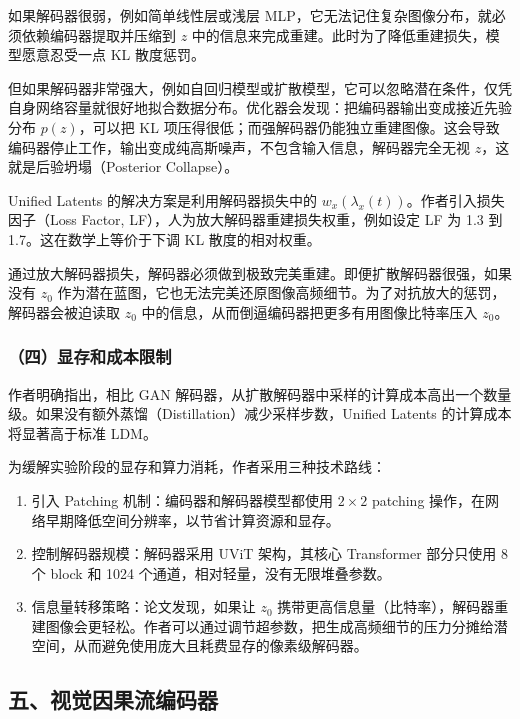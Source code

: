 如果解码器很弱，例如简单线性层或浅层 MLP，它无法记住复杂图像分布，就必须依赖编码器提取并压缩到 \(z\) 中的信息来完成重建。此时为了降低重建损失，模型愿意忍受一点 KL 散度惩罚。

但如果解码器非常强大，例如自回归模型或扩散模型，它可以忽略潜在条件，仅凭自身网络容量就很好地拟合数据分布。优化器会发现：把编码器输出变成接近先验分布 \(p(z)\)，可以把 KL 项压得很低；而强解码器仍能独立重建图像。这会导致编码器停止工作，输出变成纯高斯噪声，不包含输入信息，解码器完全无视 \(z\)，这就是后验坍塌（Posterior Collapse）。

Unified Latents 的解决方案是利用解码器损失中的 \(w_x(\lambda_x(t))\)。作者引入损失因子（Loss Factor, LF），人为放大解码器重建损失权重，例如设定 LF 为 1.3 到 1.7。这在数学上等价于下调 KL 散度的相对权重。

通过放大解码器损失，解码器必须做到极致完美重建。即便扩散解码器很强，如果没有 \(z_0\) 作为潜在蓝图，它也无法完美还原图像高频细节。为了对抗放大的惩罚，解码器会被迫读取 \(z_0\) 中的信息，从而倒逼编码器把更多有用图像比特率压入 \(z_0\)。

\hypertarget{ux56dbux663eux5b58ux548cux6210ux672cux9650ux5236}{%
\subsubsection{（四）显存和成本限制}\label{ux56dbux663eux5b58ux548cux6210ux672cux9650ux5236}}

作者明确指出，相比 GAN 解码器，从扩散解码器中采样的计算成本高出一个数量级。如果没有额外蒸馏（Distillation）减少采样步数，Unified Latents 的计算成本将显著高于标准 LDM。

为缓解实验阶段的显存和算力消耗，作者采用三种技术路线：

\begin{enumerate}
\def\labelenumi{\arabic{enumi}.}
\tightlist
\item
  引入 Patching 机制：编码器和解码器模型都使用 \(2\times2\) patching 操作，在网络早期降低空间分辨率，以节省计算资源和显存。
\item
  控制解码器规模：解码器采用 UViT 架构，其核心 Transformer 部分只使用 8 个 block 和 1024 个通道，相对轻量，没有无限堆叠参数。
\item
  信息量转移策略：论文发现，如果让 \(z_0\) 携带更高信息量（比特率），解码器重建图像会更轻松。作者可以通过调节超参数，把生成高频细节的压力分摊给潜空间，从而避免使用庞大且耗费显存的像素级解码器。
\end{enumerate}

\hypertarget{ux4e94ux89c6ux89c9ux56e0ux679cux6d41ux7f16ux7801ux5668}{%
\subsection{五、视觉因果流编码器}\label{ux4e94ux89c6ux89c9ux56e0ux679cux6d41ux7f16ux7801ux5668}}

